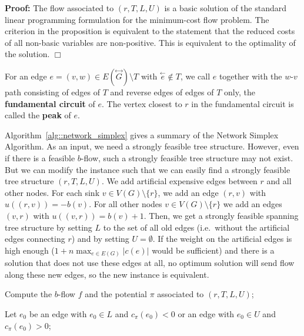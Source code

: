 \documentclass[12pt, showidx, twoside]{article}
\def\prove{\par \noindent \hbox{\bf Proof:}\quad}
\def\endproof{\hfill{$\Box$}}
\def\hi{\bf}
\begin{document}
{{{\prove
The flow associated to $(r,T,L,U)$ is a basic solution of the
standard linear programming formulation for the minimum-cost flow problem.
The criterion in the proposition is equivalent to the statement that
the reduced costs of all non-basic variables are non-positive. This
is equivalent to the optimality of the solution.
\endproof


For an edge $e=(v,w) \in E(\stackrel{\leftrightarrow}{G})\setminus T$ with
$\stackrel{\leftarrow}{e} \not \in T$, we call $e$ together 
with the $w$-$v$ path consisting of edges of $T$ and reverse edges of edges
of $T$ only, the {\hi fundamental circuit}{}
of $e$. The vertex closest to $r$ in the fundamental circuit is called
the {\hi peak}{} of $e$.


Algorithm~\ref{alg::network_simplex} gives a summary of the 
{\sc Network Simplex Algorithm}. As an input, we need a
strongly feasible tree structure. However, even if there is a feasible
$b$-flow, such a strongly feasible tree structure may not exist.
But we can modify the instance such that we can easily find a 
strongly feasible tree structure $(r,T,L,U)$. We add artificial expensive
edges between $r$ and all other nodes. For each sink 
$v \in V(G) \setminus\{r\}$, we add an edge $(r,v)$ with $u((r,v)) = -b(v)$.
For all other nodes $v \in V(G)\setminus \{r\}$ we add an edges $(v,r)$ with
$u((v,r)) = b(v) + 1$. %
Then, we get a strongly feasible spanning tree structure by setting $L$ to the
set of all old edges (i.e.\ without the artificial edges connecting $r$)
and by setting $U = \emptyset$. If the weight on the artificial edges
is high enough ($1 + n \max_{e \in E(G)}|c(e)|$ would be sufficient) and
there is a solution that does not use these edges at all, 
no optimum solution will send flow along these new edges, 
so the new instance is equivalent.


\begin{algorithm}[htb]{}
%
\DontPrintSemicolon
{}
Compute the $b$-flow $f$ and the potential $\pi$
   associated to $(r,T,L,U)$;\;

Let $e_0$ be an edge with $e_0 \in L$ and $c_\pi(e_0) < 0$ or
   an edge with $e_0 \in U$ and $c_\pi(e_0) > 0$;\;\label{alg::network::start_loop}


\end{algorithm}}}}
\end{document}
